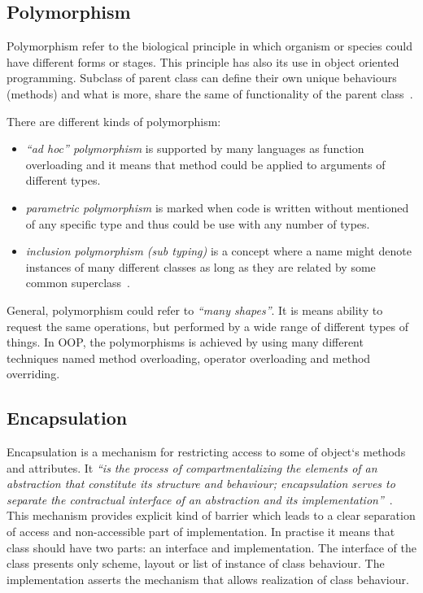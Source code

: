 \subsection*{Polymorphism}
Polymorphism refer to the biological principle in which organism or species could have different forms or stages. This principle has also its use in object oriented programming. Subclass of parent class can define their own unique behaviours (methods) and what is more, share the same of functionality of the parent class~\cite{JavaDoc}.

There are different kinds of polymorphism:
\begin{itemize}
\item \textit{``ad hoc'' polymorphism} is supported by many languages as function overloading and it means that method could be applied to arguments of different types.
\item \textit{parametric polymorphism} is marked when code is written without mentioned of any specific type and thus could be use with any number of types.
\item\textit{inclusion polymorphism (sub typing)} is a concept where a name might denote instances of many different classes as long as they are related by some common superclass~\cite{booch}.
\end{itemize}

General, polymorphism could refer to \textit{``many shapes''}. It is means ability to request the same operations, but performed by a wide range of different types of things. In OOP, the polymorphisms is achieved by using many different techniques named method overloading, operator overloading and method overriding.

\subsection*{Encapsulation}
Encapsulation is a mechanism for restricting access to some of object`s methods and attributes. It \textit{``is the process of compartmentalizing the elements of an abstraction that constitute
its structure and behaviour; encapsulation serves to separate the contractual interface of an
abstraction and its implementation''}~\cite{booch}.
This mechanism provides explicit kind of barrier which leads to a clear separation of access and non-accessible part of implementation. In practise it means that class should have two parts: an interface and implementation. The interface of the class presents only scheme, layout or list of instance of class behaviour. The implementation asserts the mechanism that allows realization of class behaviour. 


